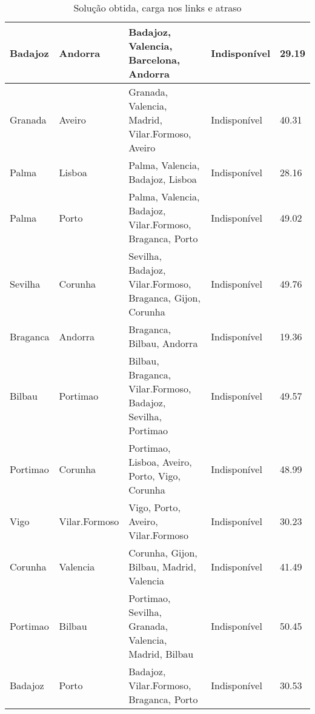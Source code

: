 \begin{table}[!htb]
{\begin{tabular}{|l|l|l|l|l|}
Badajoz & Andorra & Badajoz, Valencia, Barcelona, Andorra & Indisponível & 29.19 \\ \hline
Granada & Aveiro & Granada, Valencia, Madrid, Vilar.Formoso, Aveiro & Indisponível & 40.31 \\ \hline
Palma & Lisboa & Palma, Valencia, Badajoz, Lisboa & Indisponível & 28.16 \\ \hline
Palma & Porto & Palma, Valencia, Badajoz, Vilar.Formoso, Braganca, Porto & Indisponível & 49.02 \\ \hline
Sevilha & Corunha & Sevilha, Badajoz, Vilar.Formoso, Braganca, Gijon, Corunha & Indisponível & 49.76 \\ \hline
Braganca & Andorra & Braganca, Bilbau, Andorra & Indisponível & 19.36 \\ \hline
Bilbau & Portimao & Bilbau, Braganca, Vilar.Formoso, Badajoz, Sevilha, Portimao & Indisponível & 49.57 \\ \hline
Portimao & Corunha & Portimao, Lisboa, Aveiro, Porto, Vigo, Corunha & Indisponível & 48.99 \\ \hline
Vigo & Vilar.Formoso & Vigo, Porto, Aveiro, Vilar.Formoso & Indisponível & 30.23 \\ \hline
Corunha & Valencia & Corunha, Gijon, Bilbau, Madrid, Valencia & Indisponível & 41.49 \\ \hline
Portimao & Bilbau & Portimao, Sevilha, Granada, Valencia, Madrid, Bilbau & Indisponível & 50.45 \\ \hline
Badajoz & Porto & Badajoz, Vilar.Formoso, Braganca, Porto & Indisponível & 30.53 \\ \hline
\end{tabular}}
\caption[]{Solução obtida, carga nos links e atraso}
\end{table}

